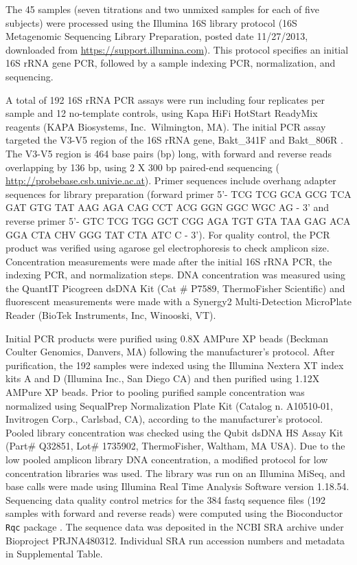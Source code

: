 \documentclass[linenumbers]{bmcart}
\begin{document}
The 45 samples (seven titrations and two unmixed samples for each of
five subjects) were processed using the Illumina 16S library protocol
(16S Metagenomic Sequencing Library Preparation, posted date 11/27/2013,
downloaded from \url{https://support.illumina.com}). This protocol
specifies an initial 16S rRNA gene PCR, followed by a sample indexing
PCR, normalization, and sequencing.

A total of 192 16S rRNA PCR assays were run including four replicates
per sample and 12 no-template controls, using Kapa HiFi HotStart
ReadyMix reagents (KAPA Biosystems, Inc.~Wilmington, MA). The initial
PCR assay targeted the V3-V5 region of the 16S rRNA gene, Bakt\_341F and
Bakt\_806R \cite{klindworth2012evaluation}. The V3-V5 region is 464
base pairs (bp) long, with forward and reverse reads overlapping by 136
bp, using 2 X 300 bp paired-end sequencing \cite{yang2016sensitivity} (
\url{http://probebase.csb.univie.ac.at}). Primer sequences include
overhang adapter sequences for library preparation (forward primer 5'-
TCG TCG GCA GCG TCA GAT GTG TAT AAG AGA CAG CCT ACG GGN GGC WGC AG - 3'
and reverse primer 5'- GTC TCG TGG GCT CGG AGA TGT GTA TAA GAG ACA GGA
CTA CHV GGG TAT CTA ATC C - 3'). For quality control, the PCR product
was verified using agarose gel electrophoresis to check amplicon size.
Concentration measurements were made after the initial 16S rRNA PCR, the
indexing PCR, and normalization steps. DNA concentration was measured
using the QuantIT Picogreen dsDNA Kit (Cat \# P7589, ThermoFisher
Scientific) and fluorescent measurements were made with a Synergy2
Multi-Detection MicroPlate Reader (BioTek Instruments, Inc, Winooski,
VT).

Initial PCR products were purified using 0.8X AMPure XP beads (Beckman
Coulter Genomics, Danvers, MA) following the manufacturer's protocol.
After purification, the 192 samples were indexed using the Illumina
Nextera XT index kits A and D (Illumina Inc., San Diego CA) and then
purified using 1.12X AMPure XP beads. Prior to pooling purified sample
concentration was normalized using SequalPrep Normalization Plate Kit
(Catalog n. A10510-01, Invitrogen Corp., Carlsbad, CA), according to the
manufacturer's protocol. Pooled library concentration was checked using
the Qubit dsDNA HS Assay Kit (Part\# Q32851, Lot\# 1735902,
ThermoFisher, Waltham, MA USA). Due to the low pooled amplicon library
DNA concentration, a modified protocol for low concentration libraries
was used. The library was run on an Illumina MiSeq, and base calls were
made using Illumina Real Time Analysis Software version 1.18.54.
Sequencing data quality control metrics for the 384 fastq sequence files
(192 samples with forward and reverse reads) were computed using the
Bioconductor \texttt{Rqc} package \cite{Rqc, Bioconductor}. The
sequence data was deposited in the NCBI SRA archive under Bioproject
PRJNA480312. Individual SRA run accession numbers and metadata in Supplemental Table.
\end{document}
